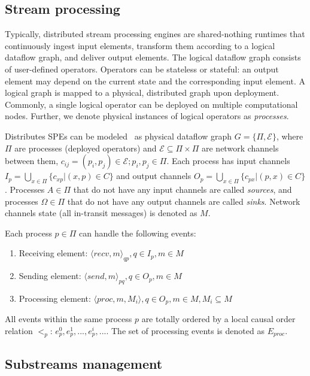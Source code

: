 \label{fs-acker-preliminaries}

\subsection{Stream processing}

Typically, distributed stream processing engines are shared-nothing runtimes that continuously ingest input elements, transform them according to a logical dataflow graph, and deliver output elements. The logical dataflow graph consists of user-defined operators. Operators can be stateless or stateful: an output element may depend on the current state and the corresponding input element. A logical graph is mapped to a physical, distributed graph upon deployment. Commonly, a single logical operator can be deployed on multiple computational nodes. Further, we denote physical instances of logical operators as {\em processes}.

Distributes SPEs can be modeled~\cite{carbone2018scalable} as physical dataflow graph $G=\{\Pi,\mathcal{E}\}$, where $\Pi$ are processes (deployed operators) and $\mathcal{E} \subseteq \Pi \times \Pi$ are network channels between them, $c_{ij}=(p_i,p_j)\in \mathcal{E}; p_i,p_j \in \Pi$. Each process has input channels $I_p = \bigcup_{x \in \Pi} \{c_{xp} | (x,p) \in C\}$ and output channels $O_p = \bigcup_{x \in \Pi} \{c_{px} | (p,x) \in C\}$. Processes $A\in \Pi$ that do not have any input channels are called {\em sources}, and processes $\Omega \in \Pi$ that do not have any output channels are called {\em sinks}. Network channels state (all in-transit messages) is denoted as $M$. 

Each process $p\in \Pi$ can handle the following events:
\begin{enumerate}
    \item Receiving element: $\langle recv,m\rangle_{qp}, q\in I_p, m\in M$
    \item Sending element: $\langle send,m\rangle_{pq}, q\in O_p, m\in M$
    \item Processing element: $\langle proc,m,M_i\rangle, q\in O_p, m\in M, M_i \subseteq M$
\end{enumerate}

All events within the same process $p$ are totally ordered by a local causal order relation $<_p$: $e^{0}_p,e^{1}_p,...,e^{i}_p,...$. The set of processing events is denoted as $E_{proc}$.

\subsection{Substreams management}

